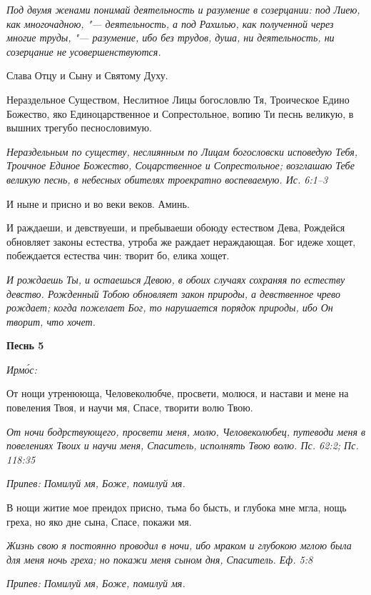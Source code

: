 \itshape Под двумя женами понимай деятельность и разумение в созерцании: под Лиею, как многочадною, "--- деятельность, а под Рахилью, как полученной через многие труды, "--- разумение, ибо без трудов, душа, ни деятельность, ни созерцание не усовершенствуются.\normalfont{}


Слава Отцу и Сыну и Святому Духу.


Нераздельное Существом, Неслитное Лицы богословлю Тя, Троическое Едино Божество, яко Единоцарственное и Сопрестольное, вопию Ти песнь великую, в вышних трегубо песнословимую.


\itshape Нераздельным по существу, неслиянным по Лицам богословски исповедую Тебя, Троичное Единое Божество, Соцарственное и Сопрестольное; возглашаю Тебе великую песнь, в небесных обителях троекратно воспеваемую. Ис. 6:1–3\normalfont{}


И ныне и присно и во веки веков. Аминь.


И раждаеши, и девствуеши, и пребываеши обоюду естеством Дева, Рождейся обновляет законы естества, утроба же раждает нераждающая. Бог идеже хощет, побеждается естества чин: творит бо, елика хощет.


\itshape И рождаешь Ты, и остаешься Девою, в обоих случаях сохраняя по естеству девство. Рожденный Тобою обновляет закон природы, а девственное чрево рождает; когда пожелает Бог, то нарушается порядок природы, ибо Он творит, что хочет.\normalfont{}





\bfseries Песнь 5\normalfont{}


\itshape Ирмо́с:\normalfont{}


От нощи утренююща, Человеколюбче, просвети, молюся, и настави и мене на повеления Твоя, и научи мя, Спасе, творити волю Твою.


\itshape От ночи бодрствующего, просвети меня, молю, Человеколюбец, путеводи меня в повелениях Твоих и научи меня, Спаситель, исполнять Твою волю. Пс. 62:2; Пс. 118:35\normalfont{}


\itshape Припев:\normalfont{} Помилуй мя, Боже, помилуй мя.


В нощи житие мое преидох присно, тьма бо бысть, и глубока мне мгла, нощь греха, но яко дне сына, Спасе, покажи мя.


\itshape Жизнь свою я постоянно проводил в ночи, ибо мраком и глубокою мглою была для меня ночь греха; но покажи меня сыном дня, Спаситель. Еф. 5:8\normalfont{}


\itshape Припев:\normalfont{} Помилуй мя, Боже, помилуй мя.


